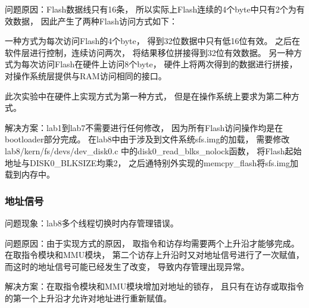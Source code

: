             问题原因：Flash数据线只有16条，%
            所以实际上Flash连续的4个byte中只有2个为有效数据，%
            因此产生了两种Flash访问方式如下：

            一种方式为每次访问Flash的4个byte，%
            得到32位数据中只有低16位有效。%
            之后在软件层进行控制，连续访问两次，%
            将结果移位拼接得到32位有效数据。%
            另一种方式为每次访问Flash在硬件上访问8个byte，%
            硬件上将两次得到的数据进行拼接，%
            对操作系统层提供与RAM访问相同的接口。

            此次实验中在硬件上实现方式为第一种方式，%
            但是在操作系统上要求为第二种方式。

            解决方案：lab1到lab7不需要进行任何修改，%
            因为所有Flash访问操作均是在bootloader部分完成。%
            在lab8中由于涉及到文件系统sfs.img的加载，%
            需要修改lab8/kern/fs/devs/dev\_disk0.c%
            中的disk0\_read\_blks\_nolock函数，%
            将Flash起始地址与DISK0\_BLKSIZE均乘2，%
            之后通特别外实现的memcpy\_flash将sfs.img加载到内存中。

        \subsubsection{地址信号}
            问题现象：lab8多个线程切换时内存管理错误。

            问题原因：由于实现方式的原因，%
            取指令和访存均需要两个上升沿才能够完成。%
            在取指令模块和MMU模块，%
            第二个访存上升沿时又对地址信号进行了一次赋值，%
            而这时的地址信号可能已经发生了改变，%
            导致内存管理出现异常。

            解决方案：在取指令模块和MMU模块增加对地址的锁存，%
            且只有在访存或取指令的第一个上升沿才允许对地址进行重新赋值。

        